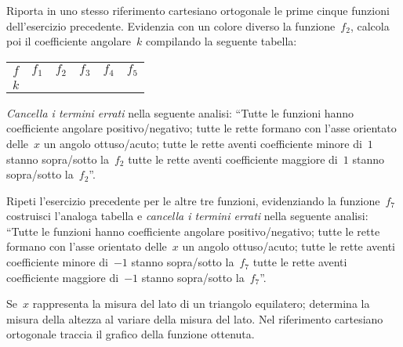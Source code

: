 \begin{esercizio}
\label{ese:D.40}
Riporta in uno stesso riferimento cartesiano ortogonale le prime cinque funzioni 
dell'esercizio precedente.
Evidenzia con un colore diverso la funzione~$f_2$, calcola poi il coefficiente 
angolare~$k$ compilando la seguente tabella:
\begin{center}
 \begin{tabular}{cccccc}
  \toprule
  $f$ &$f_1$&$f_2$& $f_3$ & $f_4$ &$f_5$\\
  $k$ & & & & &\\
  \bottomrule
 \end{tabular}
\end{center}

\emph{Cancella i termini errati} nella seguente analisi:
``Tutte le funzioni hanno coefficiente angolare positivo/negativo; tutte le 
rette formano con l'asse orientato delle~$x$ un angolo ottuso/acuto;
tutte le rette aventi coefficiente minore di~$1$ stanno sopra/sotto la~$f_{2}$ 
tutte le rette aventi coefficiente maggiore di~$1$
stanno sopra/sotto la~$f_{2}$''.
\end{esercizio}

\begin{esercizio}
\label{ese:D.41}
Ripeti l'esercizio precedente per le altre tre funzioni, evidenziando la 
funzione~$f_{7}$ costruisci l'analoga tabella e
\emph{cancella i termini errati} nella seguente analisi:
``Tutte le funzioni hanno coefficiente angolare positivo/negativo; tutte le 
rette formano con l'asse orientato delle~$x$ un angolo ottuso/acuto;
tutte le rette aventi coefficiente minore di~$-1$ stanno sopra/sotto la~$f_{7}$ 
tutte le rette aventi coefficiente maggiore di~$-1$
stanno sopra/sotto la~$f_{7}$''.
\end{esercizio}

\begin{esercizio}
\label{ese:D.42}
Se~$x$ rappresenta la misura del lato di un triangolo equilatero; determina la 
misura della altezza al variare della misura del lato.
Nel riferimento cartesiano ortogonale traccia il grafico della funzione 
ottenuta.
\end{esercizio}



